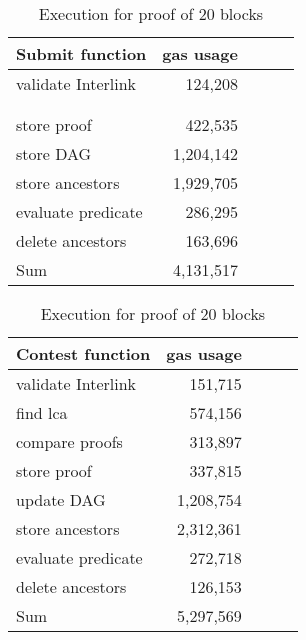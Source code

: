 \begin{table}[]
    \centering
    \begin{tabular}{@{}lccll@{}}
        \toprule
        \multicolumn{1}{c}{\textbf{Submit function}} & \textbf{gas usage}    \\ \midrule
        validate Interlink  & \multicolumn{1}{r}{124,208} \\
        \\
        \\
        store proof         & \multicolumn{1}{r}{  422,535} \\
        store DAG           & \multicolumn{1}{r}{1,204,142}\\
        store ancestors     & \multicolumn{1}{r}{1,929,705}\\
        evaluate predicate  & \multicolumn{1}{r}{  286,295} \\
        delete ancestors    & \multicolumn{1}{r}{  163,696} \\
        \midrule
        Sum                 & \multicolumn{1}{r}{4,131,517} \\
        \bottomrule
    \end{tabular}
    \quad
    \begin{tabular}{@{}lccll@{}}
        \toprule
        \multicolumn{1}{c}{\textbf{Contest function}} & \textbf{gas usage}    \\ \midrule
        validate Interlink  & \multicolumn{1}{r}{  151,715} \\
        find lca            & \multicolumn{1}{r}{  574,156} \\
        compare proofs      & \multicolumn{1}{r}{  313,897} \\
        store proof         & \multicolumn{1}{r}{  337,815} \\
        update DAG          & \multicolumn{1}{r}{1,208,754} \\
        store ancestors     & \multicolumn{1}{r}{2,312,361} \\
        evaluate predicate  & \multicolumn{1}{r}{  272,718} \\
        delete ancestors    & \multicolumn{1}{r}{  126,153} \\
        \midrule
        Sum                 & \multicolumn{1}{r}{5,297,569} \\
        \bottomrule
    \end{tabular}
    \caption{Execution for proof of 20 blocks}
    \label{table:old_gas_usage}
\end{table}
